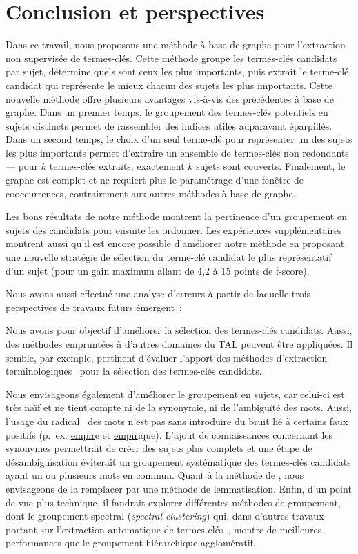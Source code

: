 \section{Conclusion et perspectives}
\label{sec:conclusion_et_perspectives}
  Dans ce travail, nous proposons une méthode à base de graphe pour
  l'extraction non supervisée de termes-clés. Cette méthode groupe les
  termes-clés candidats par sujet, détermine quels sont ceux les plus
  importants, puis extrait le terme-clé candidat qui représente le mieux chacun
  des sujets les plus importants. Cette nouvelle méthode offre plusieurs
  avantages vis-à-vis des précédentes à base de graphe. Dans un premier temps,
  le groupement des termes-clés potentiels en sujets distincts permet de
  rassembler des indices utiles auparavant éparpillés. Dans un second temps,
  le choix d'un seul terme-clé pour représenter un des sujets les plus
  importants permet d'extraire un ensemble de termes-clés non redondants ---
  pour $k$ termes-clés extraits, exactement $k$ sujets sont couverts.
  Finalement, le graphe est complet et ne requiert plus le paramétrage d'une
  fenêtre de cooccurrences, contrairement aux autres méthodes à base de graphe.

  Les bons résultats de notre méthode montrent la pertinence d'un groupement en
  sujets des candidats pour ensuite les ordonner. Les expériences
  supplémentaires montrent aussi qu'il est encore possible d'améliorer notre
  méthode en proposant une nouvelle stratégie de sélection du terme-clé candidat
  le plus représentatif d'un sujet (pour un gain maximum allant de 4,2 à 15
  points de f-score).

  Nous avons aussi effectué une analyse d'erreurs à partir de laquelle trois
  perspectives de travaux futurs émergent~:

  Nous avons pour objectif d'améliorer la sélection des
  termes-clés candidats. Aussi, des méthodes empruntées à d'autres domaines du
  TAL peuvent être appliquées. Il semble, par exemple, pertinent d'évaluer
  l'apport des méthodes d'extraction
  terminologiques~\cite{castellvi2001automatictermdetection} pour la sélection
  des termes-clés candidats.
  
  Nous envisageons également d'améliorer le groupement en sujets,
  car celui-ci est très naïf et ne tient compte ni de la synonymie, ni de
  l'ambiguïté des mots. Aussi, l'usage du
  radical~\cite{porter1980suffixstripping} des mots n'est pas sans introduire du
  bruit lié à certains faux positifs (p.~ex. \og{}\underline{empir}e\fg{} et
  \og{}\underline{empir}ique\fg{}). L'ajout de connaissances concernant les
  synonymes permettrait de créer des sujets plus complets et une étape de
  désambiguïsation éviterait un groupement systématique des termes-clés
  candidats ayant un ou plusieurs mots en commun. Quant à la méthode de
  , nous envisageons de la remplacer par une
  méthode de lemmatisation. Enfin, d'un point de vue plus technique, il faudrait
  explorer différentes méthodes de groupement, dont le groupement spectral
  (\textit{spectral clustering}) qui, dans d'autres travaux portant sur
  l'extraction automatique de termes-clés~\cite{liu2009keycluster}, montre de
  meilleures performances que le groupement hiérarchique agglomératif.

